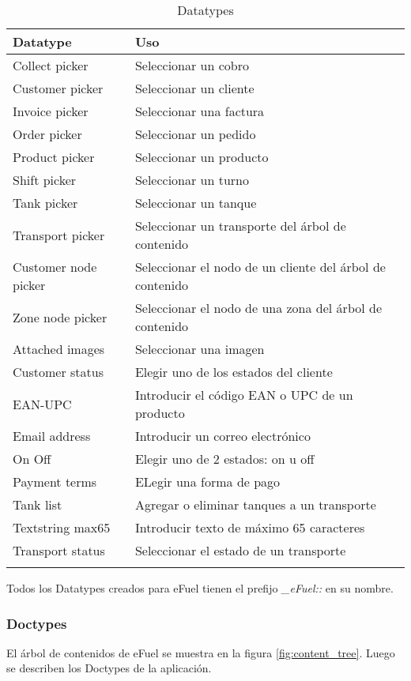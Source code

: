 \begin{longtable}{  l | l  }
    \hline\hline
    \rowcolor{gray!30}
    \textbf{Datatype} & \textbf{Uso} \\
    \hline\hline
    \endhead

    \hline
    \endfoot

    \endlastfoot

    Collect picker & Seleccionar un cobro \\
    Customer picker & Seleccionar un cliente \\
    Invoice picker & Seleccionar una factura \\
    Order picker & Seleccionar un pedido \\
    Product picker & Seleccionar un producto \\
    Shift picker & Seleccionar un turno \\
    Tank picker & Seleccionar un tanque \\
    Transport picker & Seleccionar un transporte del árbol de contenido \\
    Customer node picker & Seleccionar el nodo de un cliente del árbol de contenido \\
    Zone node picker & Seleccionar el nodo de una zona del árbol de contenido \\
    Attached images & Seleccionar una imagen \\
    Customer status & Elegir uno de los estados del cliente \\
    EAN-UPC & Introducir el código EAN o UPC de un producto \\
    Email address & Introducir un correo electrónico \\
    On Off & Elegir uno de 2 estados: on u off \\
    Payment terms & ELegir una forma de pago \\
    Tank list & Agregar o eliminar tanques a un transporte \\
    Textstring max65 & Introducir texto de máximo 65 caracteres \\
    Transport status & Seleccionar el estado de un transporte \\

    \hline

    \caption{Datatypes}
    \label{table:datatypes}
\end{longtable}

Todos los Datatypes creados para eFuel tienen el prefijo \emph{\_eFuel::} en su nombre.

\subsubsection{Doctypes}
El árbol de contenidos de eFuel se muestra en la figura \ref{fig:content_tree}. Luego se describen los Doctypes de la aplicación.


